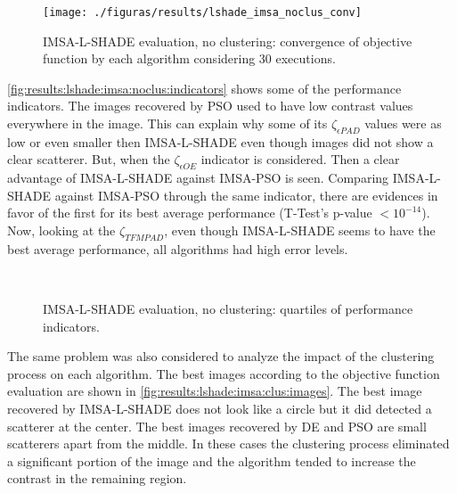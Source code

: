 			\begin{figure}
				\centering
				\texttt{[image: ./figuras/results/lshade\_imsa\_noclus\_conv]}
				\caption[IMSA-L-SHADE evaluation, no clustering: convergence.]{IMSA-L-SHADE evaluation, no clustering: convergence of objective function by each algorithm considering 30 executions.}
				\label{fig:results:lshade:imsa:noclus:convergence}
			\end{figure}
		
			\autoref{fig:results:lshade:imsa:noclus:indicators} shows some of the performance indicators. The images recovered by PSO used to have low contrast values everywhere in the image. This can explain why some of its $\zeta_{\epsilon PAD}$ values were as low or even smaller then IMSA-L-SHADE even though images did not show a clear scatterer. But, when the $\zeta_{\epsilon OE}$ indicator is considered. Then a clear advantage of IMSA-L-SHADE against IMSA-PSO is seen. Comparing IMSA-L-SHADE against IMSA-PSO through the same indicator, there are evidences in favor of the first for its best average performance (T-Test's p-value $<10^{-14}$). Now, looking at the $\zeta_{TFMPAD}$, even though IMSA-L-SHADE seems to have the best average performance, all algorithms had high error levels.
		
			\begin{figure}
				\centering
				 \\
				\caption[IMSA-L-SHADE evaluation, no clustering: indicators.]{IMSA-L-SHADE evaluation, no clustering: quartiles of performance indicators.}
				\label{fig:results:lshade:imsa:noclus:indicators}
			\end{figure}
		
			The same problem was also considered to analyze the impact of the clustering process on each algorithm. The best images according to the objective function evaluation are shown in \autoref{fig:results:lshade:imsa:clus:images}. The best image recovered by IMSA-L-SHADE does not look like a circle but it did detected a scatterer at the center. The best images recovered by DE and PSO are small scatterers apart from the middle. In these cases the clustering process eliminated a significant portion of the image and the algorithm tended to increase the contrast in the remaining region. 
		
